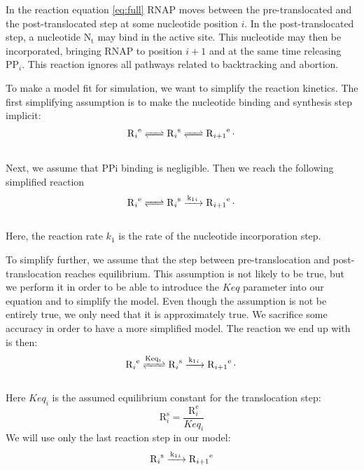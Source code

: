 \documentclass[a4paper]{article}
\newcommand{\te}[1]{\text{#1}}
\begin{document}
In the reaction equation \eqref{eq:full} RNAP moves between the pre-translocated and the
post-translocated step at some nucleotide position $i$. In the
post-translocated step, a nucleotide $\te{N}_{\te{t}}$ may bind in the active
site. This nucleotide may then be incorporated, bringing RNAP to position
$i+1$ and at the same time releasing $\te{PP}_i$. This reaction ignores all
pathways related to backtracking and abortion.

To make a model fit for simulation, we want to simplify the reaction kinetics.
The first simplifying assumption is to make the nucleotide binding and
synthesis step implicit:
\\
\begin{align}
\ce{R_i^{\text{e}}
<=>
R_i^{\text{s}}
<=>
R_{i+1}^{\text{e}}.
}
\label{eq:reduced3}
\end{align}
\\
Next, we assume that PPi binding is negligible. Then we reach the
following simplified reaction
\\
\begin{align}
\ce{R_i^{\text{e}}
<=>
R_i^{\text{s}}
->[\ce{k1_i}]
R_{i+1}^{\text{e}}.
}
\label{eq:reduced33}
\end{align}
\\
Here, the reaction rate $k_1$ is the rate of the nucleotide incorporation step.

To simplify further, we assume that the step between pre-translocation and
post-translocation reaches equilibrium. This assumption is not likely to be
true, but we perform it in order to be able to introduce the $Keq$ parameter
into our equation and to simplify the model. Even though the assumption is not
be entirely true, we only need that it is approximately true. We sacrifice some
accuracy in order to have a more simplified model. The reaction we end up with
is then:
\\
\begin{align}
\ce{R_i^{\text{e}}
<=>[\ce{Keq_i}]
R_i^{\text{s}}
->[\ce{k1_i}]
R_{i+1}^{\text{e}}.
}
\label{eq:reduced4}
\end{align}
\\
Here $Keq_i$ is the assumed equilibrium constant for the translocation step:
\begin{equation}
	\te{R}_i^{\te{s}} = \frac{\te{R}_i^{\te{e}}}{Keq_i}
	\label{eq:keq}
\end{equation}
We will use only the last reaction step in our model:
\\
\begin{align}
\ce{R_i^{\text{s}}
->[\ce{k1_i}]
R_{i+1}^{\text{e}}
}
\label{eq:reduced5}
\end{align}
\end{document}
